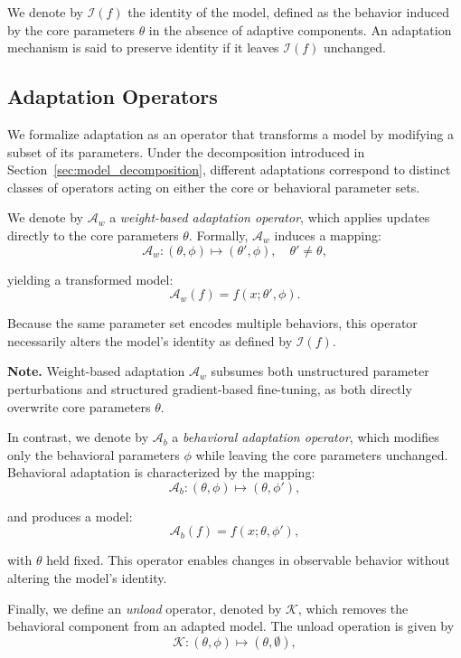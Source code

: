 \documentclass{article}
\begin{document}
	We denote by $\mathcal{I}(f)$ the identity of the model, defined as the behavior induced by the core parameters $\theta$ in the absence of adaptive components. An adaptation mechanism is said to preserve identity if it leaves $\mathcal{I}(f)$ unchanged.
	
	\subsection{Adaptation Operators}
	\label{sec:adaptation_operators}
	
	We formalize adaptation as an operator that transforms a model by modifying a subset of its parameters. Under the decomposition introduced in Section~\ref{sec:model_decomposition}, different adaptations correspond to distinct classes of operators acting on either the core or behavioral parameter sets.
	
	We denote by $\mathcal{A}_w$ a \emph{weight-based adaptation operator}, which applies updates directly to the core parameters $\theta$. Formally, $\mathcal{A}_w$ induces a mapping:
	\[
	\mathcal{A}_w : (\theta,\phi) \mapsto (\theta',\phi), \quad \theta' \neq \theta,
	\]
	
	yielding a transformed model:
	\[
	\mathcal{A}_w(f) = f(x;\theta',\phi).
	\]
	
	Because the same parameter set encodes multiple behaviors, this operator necessarily alters the model’s identity as defined by $\mathcal{I}(f)$.  
	
	\noindent\textbf{Note.} Weight-based adaptation $\mathcal{A}_w$ subsumes both unstructured parameter perturbations and structured gradient-based fine-tuning, as both directly overwrite core parameters $\theta$.
	
	In contrast, we denote by $\mathcal{A}_b$ a \emph{behavioral adaptation operator}, which modifies only the behavioral parameters $\phi$ while leaving the core parameters unchanged. Behavioral adaptation is characterized by the mapping:
	\[
	\mathcal{A}_b : (\theta,\phi) \mapsto (\theta,\phi'),
	\]
	
	and produces a model:
	\[
	\mathcal{A}_b(f) = f(x;\theta,\phi'),
	\]
	
	with $\theta$ held fixed. This operator enables changes in observable behavior without altering the model’s identity.
	
	Finally, we define an \emph{unload} operator, denoted by $\mathcal{K}$, which removes the behavioral component from an adapted model. The unload operation is given by
	\[
	\mathcal{K} : (\theta,\phi) \mapsto (\theta,\emptyset),
	\]
	
\end{document}
